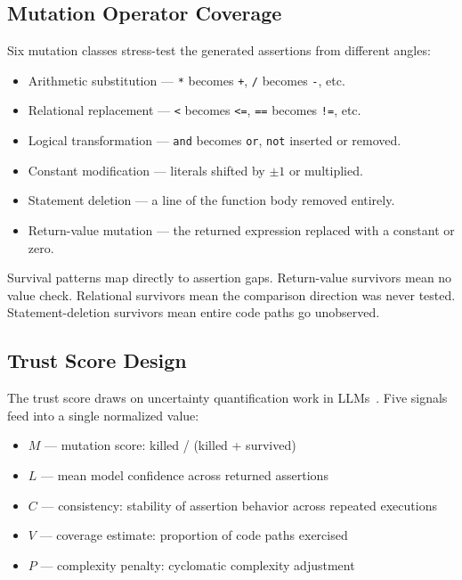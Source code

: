 \documentclass[conference]{IEEEtran}
\begin{document}
\subsection{Mutation Operator Coverage}

Six mutation classes stress-test the generated assertions from different angles:

\begin{itemize}
\item Arithmetic substitution — \texttt{*} becomes \texttt{+}, \texttt{/} becomes \texttt{-}, etc.
\item Relational replacement — \texttt{<} becomes \texttt{<=}, \texttt{==} becomes \texttt{!=}, etc.
\item Logical transformation — \texttt{and} becomes \texttt{or}, \texttt{not} inserted or removed.
\item Constant modification — literals shifted by $\pm1$ or multiplied.
\item Statement deletion — a line of the function body removed entirely.
\item Return-value mutation — the returned expression replaced with a constant or zero.
\end{itemize}

Survival patterns map directly to assertion gaps. Return-value survivors mean no value check. Relational survivors mean the comparison direction was never tested. Statement-deletion survivors mean entire code paths go unobserved.

\subsection{Trust Score Design}

The trust score draws on uncertainty quantification work in LLMs~\cite{xiong2023express_confidence,liu2024uncertainty_estimation}. Five signals feed into a single normalized value:

\begin{itemize}
\item $M$ — mutation score: killed / (killed + survived)
\item $L$ — mean model confidence across returned assertions
\item $C$ — consistency: stability of assertion behavior across repeated executions
\item $V$ — coverage estimate: proportion of code paths exercised
\item $P$ — complexity penalty: cyclomatic complexity adjustment
\end{itemize}
\end{document}
